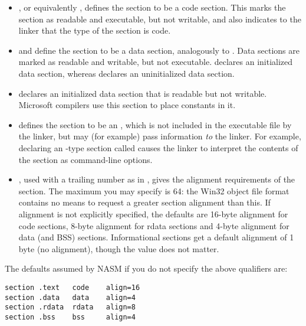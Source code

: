 \begin{itemize}
    \item{, or equivalently , defines the section
        to be a code section. This marks the section as readable and
        executable, but not writable, and also indicates to the linker
        that the type of the section is code.}

    \item{ and  define the section to be a data
        section, analogously to . Data sections are marked
        as readable and writable, but not executable. 
        declares an initialized data section, whereas  declares
        an uninitialized data section.}

    \item{ declares an initialized data section that is
        readable but not writable. Microsoft compilers use this section
        to place constants in it.}

    \item{ defines the section to be an ,
        which is not included in the executable file by the linker, but may
        (for example) pass information \emph{to} the linker. For example,
        declaring an -type section called  causes
        the linker to interpret the contents of the section as command-line
        options.}

    \item{, used with a trailing number as in , gives the
         
        alignment requirements of the section. The maximum you may
        specify is 64: the Win32 object file format contains no means to
        request a greater section alignment than this. If alignment is not
        explicitly specified, the defaults are 16-byte alignment for code
        sections, 8-byte alignment for rdata sections and 4-byte alignment
        for data (and BSS) sections.
        Informational sections get a default alignment of 1 byte (no
        alignment), though the value does not matter.}
\end{itemize}

The defaults assumed by NASM if you do not specify the above
qualifiers are:

\begin{lstlisting}
section .text   code    align=16
section .data   data    align=4
section .rdata  rdata   align=8
section .bss    bss     align=4
\end{lstlisting}

